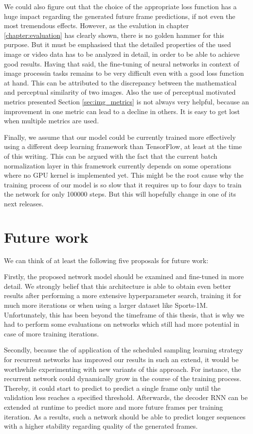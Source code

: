 We could also figure out that the choice of the appropriate loss function has a huge impact regarding the generated future frame predictions, if not even the most tremendous effects. However, as the evalution in chapter \ref{chapter:evaluation} has clearly shown, there is no golden hammer for this purpose. But it must be emphasised that the detailed properties of the used image or video data has to be analyzed in detail, in order to be able to achieve good results. Having that said, the fine-tuning of neural networks in context of image processin tasks remains to be very difficult even with a good loss function at hand. This can be attributed to the discrepancy between the mathematical and perceptual similarity of two images. Also the use of perceptual motivated metrics presented Section \ref{sec:img_metrics} is not always very helpful, because an improvement in one metric can lead to a decline in others. It is easy to get lost when multiple metrics are used.

Finally, we assume that our model could be currently trained more effectively using a different deep learning framework than TensorFlow, at least at the time of this writing. This can be argued with the fact that the current batch normalization layer in this framework currently depends on some operations where no GPU kernel is implemented yet. This might be the root cause why the training process of our model is so slow that it requires up to four days to train the network for only \num{100000} steps. But this will hopefully change in one of its next releases.


\section{Future work}

We can think of at least the following five proposals for future work:

Firstly, the proposed network model should be examined and fine-tuned in more detail. We strongly belief that this architecture is able to obtain even better results after performing a more extensive hyperparameter search, training it for much more iterations or when using a larger dataset like Sports-1M. Unfortunately, this has been beyond the timeframe of this thesis, that is why we had to perform some evaluations on networks which still had more potential in case of more training iterations.

Secondly, because the of application of the scheduled sampling learning strategy for recurrent networks has improved our results in such an extend, it would be worthwhile experimenting with new variants of this approach. For instance, the recurrent network could dynamically grow in the course of the training process. Thereby, it could start to predict to predict a single frame only until the validation less reaches a specified threshold. Afterwards, the decoder RNN can be extended at runtime to predict more and more future frames per training iteration. As a results, such a network should be able to predict longer sequences with a higher stability regarding quality of the generated frames. 

